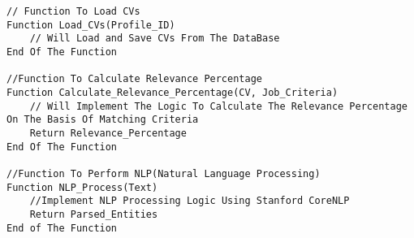 \begin{lstlisting}[language=pseudocode, caption={Pseudocode for the CV Analyser}]
// Function To Load CVs
Function Load_CVs(Profile_ID)
    // Will Load and Save CVs From The DataBase
End Of The Function

//Function To Calculate Relevance Percentage
Function Calculate_Relevance_Percentage(CV, Job_Criteria)
    // Will Implement The Logic To Calculate The Relevance Percentage On The Basis Of Matching Criteria
    Return Relevance_Percentage
End Of The Function

//Function To Perform NLP(Natural Language Processing)
Function NLP_Process(Text)
    //Implement NLP Processing Logic Using Stanford CoreNLP
    Return Parsed_Entities
End of The Function
\end{lstlisting}